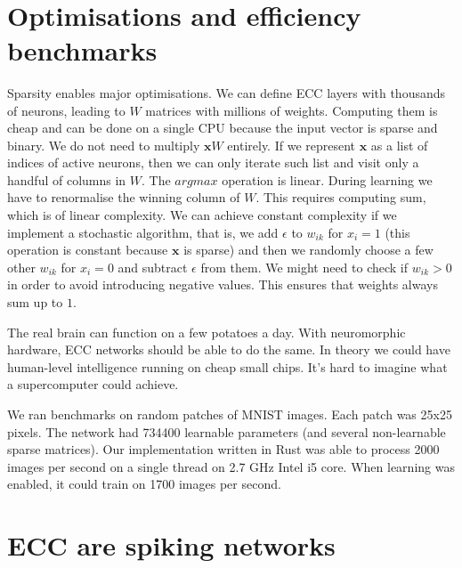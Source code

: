 \documentclass[12pt]{article}
\begin{document}
\


\section{Optimisations and efficiency benchmarks}

Sparsity enables major optimisations. We can define ECC layers with thousands of neurons, leading to $W$ matrices with millions of weights. Computing them is cheap and can be done on a single CPU because the input vector is sparse and binary. We do not need to multiply $\boldsymbol{x}W$ entirely. If we represent $\boldsymbol{x}$ as a list of indices of active neurons, then we can only iterate such list and visit only a handful of columns in $W$. The $argmax$ operation is linear. During learning we have to renormalise the winning column of $W$. This requires computing sum, which is of linear complexity. We can achieve constant complexity if we implement a stochastic algorithm, that is, we add $\epsilon$ to $w_{ik}$ for $x_i=1$ (this operation is constant because $\boldsymbol{x}$ is sparse) and then we randomly choose a few other $w_{ik}$ for $x_i=0$ and subtract $\epsilon$ from them. We might need to check if $w_{ik}>0$ in order to avoid introducing negative values. This ensures that weights always sum up to $1$.

The real brain can function on a few potatoes a day. With neuromorphic hardware, ECC networks should be able to do the same. In theory we could have human-level intelligence running on cheap small chips. It's hard to imagine what a supercomputer could achieve.

We ran benchmarks on random patches of MNIST images. Each patch was 25x25 pixels. The network had 734400 learnable parameters (and several non-learnable sparse matrices). Our implementation written in Rust was able to process 2000 images per second on a single thread on 2.7 GHz Intel i5 core. When learning was enabled, it could train on 1700 images per second.


\section{ECC are spiking networks}
\end{document}
